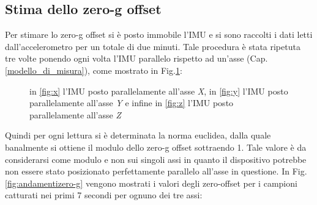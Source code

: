\subsection{Stima dello zero-g offset}
Per stimare lo zero-g offset si è posto immobile l'IMU e si sono raccolti i dati letti dall'accelerometro per un totale di due minuti. Tale procedura è stata ripetuta tre volte ponendo ogni volta l'IMU parallelo rispetto ad un'asse (Cap.\ref{modello_di_misura}), come mostrato in Fig.\ref{fig:zero-g}:
\begin{figure}[H]
	\centering    
	\label{fig:zero-g}
	\caption{in \ref{fig:x} l'IMU posto parallelamente all'asse \textit{X}, in \ref{fig:y} l'IMU posto parallelamente all'asse \textit{Y} e infine in \ref{fig:z} l'IMU posto parallelamente all'asse \textit{Z}}
\end{figure}
Quindi per ogni lettura si è determinata la norma euclidea, dalla quale banalmente si ottiene il modulo dello zero-g offset sottraendo 1. Tale valore è da considerarsi come modulo e non sui singoli assi in quanto il dispositivo potrebbe non essere stato posizionato perfettamente parallelo all'asse in questione. In Fig.\ref{fig:andamentizero-g} vengono mostrati i valori degli zero-offset per i campioni catturati nei primi 7 secondi per ognuno dei tre assi:

